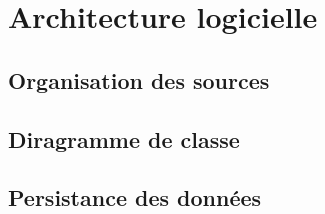 \chapter{Architecture logicielle}


\section{Organisation des sources}
        \paragraph*{}


\section{Diragramme de classe}
        \paragraph*{}


\section{Persistance des données}
        \paragraph*{}






